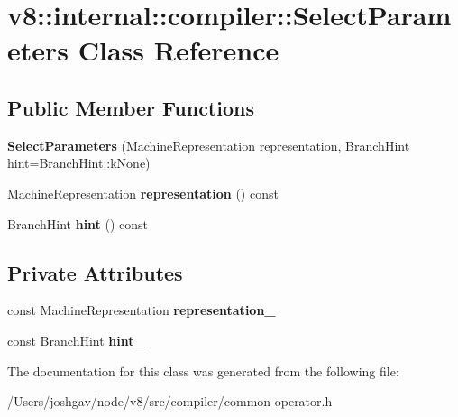 \hypertarget{classv8_1_1internal_1_1compiler_1_1_select_parameters}{}\section{v8\+:\+:internal\+:\+:compiler\+:\+:Select\+Parameters Class Reference}
\label{classv8_1_1internal_1_1compiler_1_1_select_parameters}
\subsection*{Public Member Functions}
\begin{DoxyCompactItemize}
\item 
{\bfseries Select\+Parameters} (Machine\+Representation representation, Branch\+Hint hint=Branch\+Hint\+::k\+None)\hypertarget{classv8_1_1internal_1_1compiler_1_1_select_parameters_ace7b2e55e0ed31d8089fe4637f78dd35}{}\label{classv8_1_1internal_1_1compiler_1_1_select_parameters_ace7b2e55e0ed31d8089fe4637f78dd35}

\item 
Machine\+Representation {\bfseries representation} () const \hypertarget{classv8_1_1internal_1_1compiler_1_1_select_parameters_aa58eb33c99188b889d0da90563107a9b}{}\label{classv8_1_1internal_1_1compiler_1_1_select_parameters_aa58eb33c99188b889d0da90563107a9b}

\item 
Branch\+Hint {\bfseries hint} () const \hypertarget{classv8_1_1internal_1_1compiler_1_1_select_parameters_a7e1ae92ad0d34db8bffff8161fc755cb}{}\label{classv8_1_1internal_1_1compiler_1_1_select_parameters_a7e1ae92ad0d34db8bffff8161fc755cb}

\end{DoxyCompactItemize}
\subsection*{Private Attributes}
\begin{DoxyCompactItemize}
\item 
const Machine\+Representation {\bfseries representation\+\_\+}\hypertarget{classv8_1_1internal_1_1compiler_1_1_select_parameters_ac598679bd17773e45c136b5bdf3e18d7}{}\label{classv8_1_1internal_1_1compiler_1_1_select_parameters_ac598679bd17773e45c136b5bdf3e18d7}

\item 
const Branch\+Hint {\bfseries hint\+\_\+}\hypertarget{classv8_1_1internal_1_1compiler_1_1_select_parameters_acb9bca84b00f2667fa483cb97f2bc3c4}{}\label{classv8_1_1internal_1_1compiler_1_1_select_parameters_acb9bca84b00f2667fa483cb97f2bc3c4}

\end{DoxyCompactItemize}


The documentation for this class was generated from the following file\+:\begin{DoxyCompactItemize}
\item 
/\+Users/joshgav/node/v8/src/compiler/common-\/operator.\+h\end{DoxyCompactItemize}
